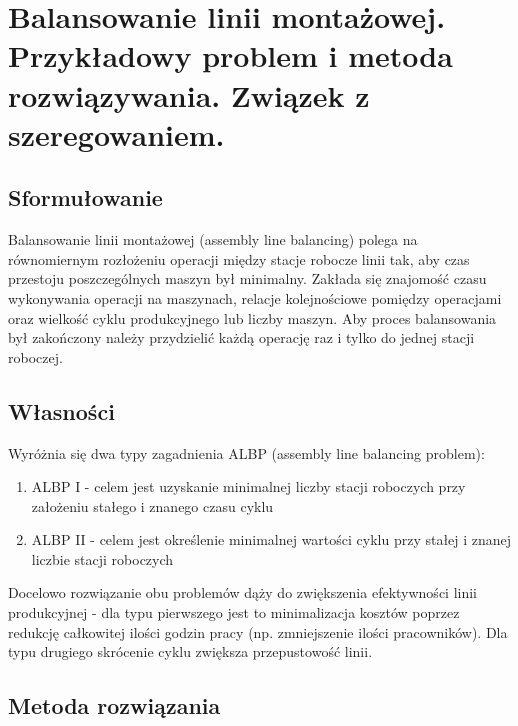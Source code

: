 \section{Balansowanie linii montażowej.
Przykładowy problem i metoda rozwiązywania.
Związek z 
szeregowaniem.}

\subsection{Sformułowanie}
Balansowanie linii montażowej (assembly line balancing) polega na równomiernym rozłożeniu operacji między stacje robocze linii tak, aby czas przestoju poszczególnych maszyn był minimalny. Zakłada się znajomość czasu wykonywania operacji na maszynach, relacje kolejnościowe pomiędzy operacjami oraz wielkość cyklu produkcyjnego lub liczby maszyn. Aby proces balansowania był zakończony należy przydzielić każdą operację raz i tylko do jednej stacji roboczej.
		
\subsection{Własności}
Wyróżnia się dwa typy zagadnienia ALBP (assembly line balancing problem):
\begin{enumerate}
\item ALBP I - celem jest uzyskanie minimalnej liczby stacji roboczych przy założeniu stałego i znanego czasu cyklu
\item ALBP II - celem jest określenie minimalnej wartości cyklu przy stałej i znanej liczbie stacji roboczych
\end{enumerate}
Docelowo rozwiązanie obu problemów dąży do zwiększenia efektywności linii produkcyjnej - dla typu pierwszego jest to minimalizacja kosztów poprzez redukcję całkowitej ilości godzin pracy (np. zmniejszenie ilości pracowników). Dla typu drugiego skrócenie cyklu zwiększa przepustowość linii.
	
		
\subsection{Metoda rozwiązania}
